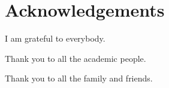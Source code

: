\chapter{Acknowledgements}
\begin{center}
\vspace{1cm}

{\fontsize{14.5}{15}\selectfont I am grateful to everybody.}
\vspace{0.5cm}

{\fontsize{14.5}{15}\selectfont Thank you to all the academic people.}
\vspace{0.5cm}

{\fontsize{14.5}{15}\selectfont Thank you to all the family and friends.}
\end{center}
\vspace{\fill}